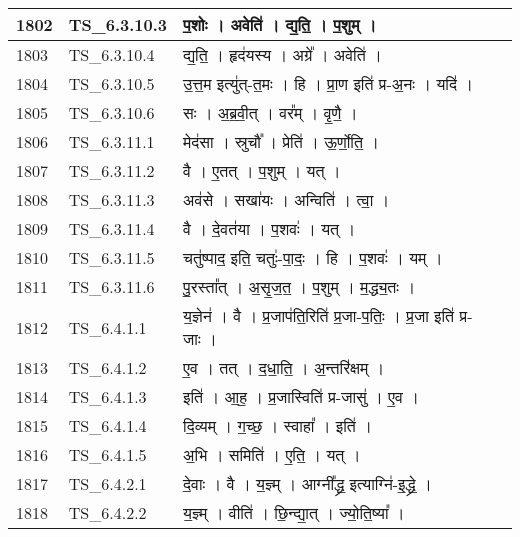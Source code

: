 \documentclass[17pt]{extarticle}
\begin{document}
\begin{longtable}{||p{0.4in}||p{0.9in}||p{4.0in}||p{0.9in}||}
        \hline
            1802 & TS\_6.3.10.3 & प॒शोः   ।   अवेति॑   ।   द्य॒ति॒   ।   प॒शुम्   ।    &      \\
        \hline
            1803 & TS\_6.3.10.4 & द्य॒ति॒   ।   हृद॑यस्य   ।   अग्रे᳚   ।   अवेति॑   ।    &      \\
        \hline
            1804 & TS\_6.3.10.5 & उ॒त्त॒म इत्यु॑त्{-}त॒मः   ।   हि   ।   प्रा॒ण इति॑ प्र{-}अ॒नः   ।   यदि॑   ।    &      \\
        \hline
            1805 & TS\_6.3.10.6 & सः   ।   अ॒ब्र॒वी॒त्   ।   वर᳚म्   ।   वृ॒णै॒   ।    &      \\
        \hline
            1806 & TS\_6.3.11.1 & मेद॑सा   ।   स्रुचौ᳚   ।   प्रेति॑   ।   ऊ॒र्णो॒ति॒   ।    &      \\
        \hline
            1807 & TS\_6.3.11.2 & वै   ।   ए॒तत्   ।   प॒शुम्   ।   यत्   ।    &      \\
        \hline
            1808 & TS\_6.3.11.3 & अव॑से   ।   सखा॑यः   ।   अन्विति॑   ।   त्वा॒   ।    &      \\
        \hline
            1809 & TS\_6.3.11.4 & वै   ।   दे॒वत॑या   ।   प॒शवः॑   ।   यत्   ।    &      \\
        \hline
            1810 & TS\_6.3.11.5 & चतु॑ष्पाद॒ इति॒ चतुः॑{-}पा॒दः॒   ।   हि   ।   प॒शवः॑   ।   यम्   ।    &      \\
        \hline
            1811 & TS\_6.3.11.6 & पु॒रस्ता᳚त्   ।   अ॒सृ॒ज॒त॒   ।   प॒शुम्   ।   म॒द्ध्य॒तः   ।    &      \\
        \hline
            1812 & TS\_6.4.1.1 & य॒ज्ञेन॑   ।   वै   ।   प्र॒जाप॑ति॒रिति॑ प्र॒जा{-}प॒तिः॒   ।   प्र॒जा इति॑ प्र{-}जाः   ।    &      \\
        \hline
            1813 & TS\_6.4.1.2 & ए॒व   ।   तत्   ।   द॒धा॒ति॒   ।   अ॒न्तरि॑क्षम्   ।    &      \\
        \hline
            1814 & TS\_6.4.1.3 & इति॑   ।   आ॒ह॒   ।   प्र॒जास्विति॑ प्र{-}जासु॑   ।   ए॒व   ।    &      \\
        \hline
            1815 & TS\_6.4.1.4 & दि॒व्यम्   ।   ग॒च्छ॒   ।   स्वाहा᳚   ।   इति॑   ।    &      \\
        \hline
            1816 & TS\_6.4.1.5 & अ॒भि   ।   समिति॑   ।   ए॒ति॒   ।   यत्   ।    &      \\
        \hline
            1817 & TS\_6.4.2.1 & दे॒वाः   ।   वै   ।   य॒ज्ञ्म्   ।   आग्नी᳚द्ध्र॒ इत्याग्नि॑{-}इ॒द्ध्रे॒   ।    &      \\
        \hline
            1818 & TS\_6.4.2.2 & य॒ज्ञ्म्   ।   वीति॑   ।   छि॒न्द्या॒त्   ।   ज्यो॒ति॒ष्या᳚   ।    &      \\

\end{longtable}
\end{document}
